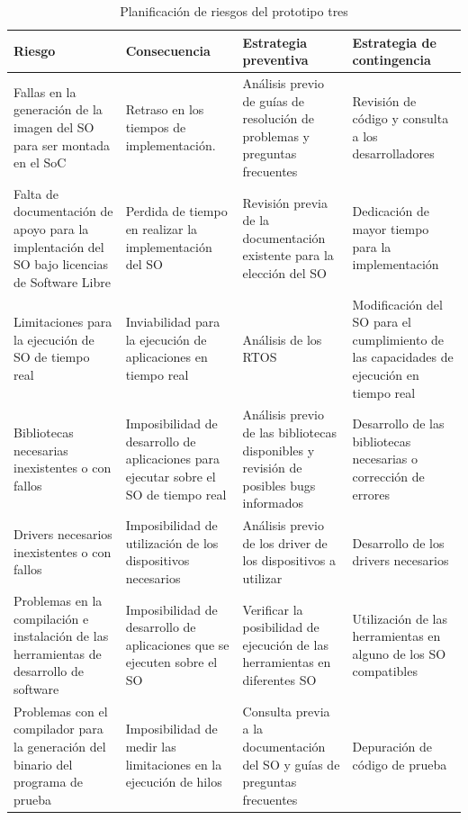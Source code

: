 		
 		\begin{table}[h!]
		\centering
		\begin{tabular}{ p{4cm} p{4cm} p{4cm} p{3cm} }
		\hline 
		\rowcolor[gray]{0.8} Riesgo & Consecuencia & Estrategia preventiva & Estrategia de contingencia\\
		\hline
		Fallas en la generación de la imagen del SO para ser montada en el SoC &Retraso en los tiempos de implementación.& Análisis previo de guías de resolución de problemas y preguntas frecuentes & Revisión de código y consulta a los desarrolladores\\		 
		\hline
		Falta de documentación de apoyo para la implentación del SO bajo licencias de Software Libre& Perdida de tiempo en realizar la implementación del SO & Revisión previa de la documentación existente para la elección del
SO & Dedicación de mayor tiempo para la implementación\\ 
		\hline
		 Limitaciones para la ejecución de SO de tiempo real & Inviabilidad para la ejecución
de aplicaciones en tiempo real & Análisis de los RTOS &Modificación del SO para el cumplimiento de las capacidades de ejecución en tiempo real\\
		\hline
		Bibliotecas necesarias inexistentes o con fallos& Imposibilidad de desarrollo de aplicaciones para ejecutar sobre el SO de tiempo real& Análisis previo de las bibliotecas disponibles y revisión de posibles bugs informados& Desarrollo de las bibliotecas necesarias o corrección de errores\\			
		\hline
		Drivers necesarios inexistentes o con fallos & Imposibilidad de utilización
de los dispositivos necesarios&Análisis previo de los driver de los dispositivos a utilizar& Desarrollo de los drivers necesarios\\		
		\hline
		 Problemas en la compilación e instalación de las herramientas de desarrollo de software & Imposibilidad de desarrollo de aplicaciones que se ejecuten sobre el SO& Verificar la posibilidad de ejecución de las herramientas
en diferentes SO & Utilización de las herramientas en alguno de los SO compatibles\\
		\hline
		 Problemas con el compilador para la generación del binario del programa de prueba& Imposibilidad de medir las limitaciones en la ejecución de hilos & Consulta previa a la documentación del SO y guías de preguntas frecuentes & Depuración de código de prueba\\
		\hline
		\end{tabular}
		\caption{Planificación de riesgos del prototipo tres}
		\label{tab:planificación3}
		\end{table}

